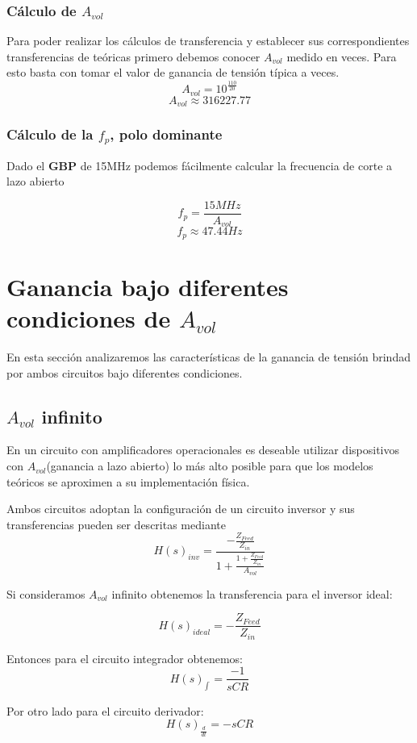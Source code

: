 \documentclass[a4paper]{article}
\begin{document}
 \subsubsection{Cálculo de $A_{vol}$}
Para poder realizar los cálculos de transferencia y establecer sus correspondientes transferencias de teóricas primero debemos conocer $A_{vol}$ medido en veces. Para esto basta con tomar el valor de ganancia de tensión típica a veces.
$$A_{vol} = 10^{\frac{110}{20}}$$
$$A_{vol} \approx 316227.77$$

\subsubsection{Cálculo de  la $f_p$, polo dominante}

Dado el \textbf{GBP} de 15MHz podemos fácilmente calcular la frecuencia de corte a lazo abierto

$$ f_p = \frac{15MHz}{A_{vol}} $$
$$ f_p \approx 47.44Hz$$

\section{Ganancia bajo diferentes condiciones de $A_{vol}$}
En esta sección analizaremos las características de la ganancia de tensión brindad por ambos circuitos bajo diferentes condiciones.

\subsection{$A_{vol}$ infinito}
En un circuito con amplificadores operacionales es deseable utilizar dispositivos con $A_{vol}$(ganancia a lazo abierto) lo más alto posible para que los modelos teóricos se aproximen a su implementación física.

Ambos circuitos adoptan la configuración de un circuito inversor y sus transferencias pueden ser descritas mediante
$$H(s)_{inv} = \frac{-\frac{Z_{Feed}}{Z_{in}}}
{1+\frac{1+\frac{Z_{Feed}}{Z_{in}}}{A_{vol}}} $$

Si consideramos $A_{vol}$ infinito obtenemos la transferencia para el inversor ideal:

$$H(s)_{ideal} = -\frac{Z_{Feed}}{Z_{in}}$$

Entonces para el circuito integrador obtenemos:
$$H(s)_{\int_{}{}} = \frac{-1}{sCR} $$

Por otro lado para el circuito derivador:
$$H(s)_{\frac{d}{dt}}=-sCR$$
\end{document}
